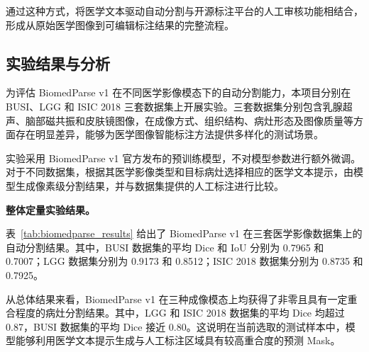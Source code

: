 \documentclass[10.5pt,compsoc]{CjC}
\theoremstyle{mystyle}
\begin{document}
通过这种方式，将医学文本驱动自动分割与开源标注平台的人工审核功能相结合，形成从原始医学图像到可编辑标注结果的完整流程。



















\subsection{实验结果与分析}

为评估 BiomedParse v1 在不同医学影像模态下的自动分割能力，本项目分别在 BUSI、LGG 和 ISIC 2018 三套数据集上开展实验。三套数据集分别包含乳腺超声、脑部磁共振和皮肤镜图像，在成像方式、组织结构、病灶形态及图像质量等方面存在明显差异，能够为医学图像智能标注方法提供多样化的测试场景。

实验采用 BiomedParse v1 官方发布的预训练模型，不对模型参数进行额外微调。对于不同数据集，根据其医学影像类型和目标病灶选择相应的医学文本提示，由模型生成像素级分割结果，并与数据集提供的人工标注进行比较。


\noindent\textbf{整体定量实验结果。}

表~\ref{tab:biomedparse_results} 给出了 BiomedParse v1 在三套医学影像数据集上的自动分割结果。其中，BUSI 数据集的平均 Dice 和 IoU 分别为 0.7965 和 0.7007；LGG 数据集分别为 0.9173 和 0.8512；ISIC 2018 数据集分别为 0.8735 和 0.7925。

\begin{table}[htbp]
\centering
\caption{BiomedParse v1 在三个医学影像数据集上的分割结果}
\label{tab:biomedparse_results}
\vspace{1.5mm}
\end{table}

从总体结果来看，BiomedParse v1 在三种成像模态上均获得了非零且具有一定重合程度的病灶分割结果。其中，LGG 和 ISIC 2018 数据集的平均 Dice 均超过 0.87，BUSI 数据集的平均 Dice 接近 0.80。这说明在当前选取的测试样本中，模型能够利用医学文本提示生成与人工标注区域具有较高重合度的预测 Mask。
\end{document}
